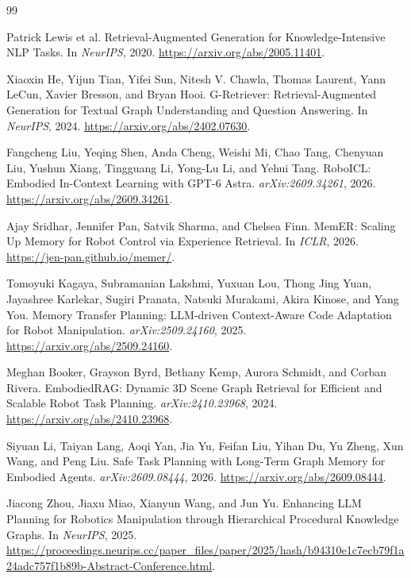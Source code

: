 \documentclass[10pt,twocolumn,letterpaper]{article}
\begin{document}

\begin{thebibliography}{99}

Patrick Lewis et al.
Retrieval-Augmented Generation for Knowledge-Intensive NLP Tasks.
In \emph{NeurIPS}, 2020.
\url{https://arxiv.org/abs/2005.11401}.

Xiaoxin He, Yijun Tian, Yifei Sun, Nitesh V. Chawla, Thomas Laurent, Yann LeCun, Xavier Bresson, and Bryan Hooi.
G-Retriever: Retrieval-Augmented Generation for Textual Graph Understanding and Question Answering.
In \emph{NeurIPS}, 2024.
\url{https://arxiv.org/abs/2402.07630}.

Fangcheng Liu, Yeqing Shen, Anda Cheng, Weishi Mi, Chao Tang, Chenyuan Liu, Yushun Xiang, Tingguang Li, Yong-Lu Li, and Yehui Tang.
RoboICL: Embodied In-Context Learning with GPT-6 Astra.
\emph{arXiv:2609.34261}, 2026.
\url{https://arxiv.org/abs/2609.34261}.

Ajay Sridhar, Jennifer Pan, Satvik Sharma, and Chelsea Finn.
MemER: Scaling Up Memory for Robot Control via Experience Retrieval.
In \emph{ICLR}, 2026.
\url{https://jen-pan.github.io/memer/}.

Tomoyuki Kagaya, Subramanian Lakshmi, Yuxuan Lou, Thong Jing Yuan, Jayashree Karlekar, Sugiri Pranata, Natsuki Murakami, Akira Kinose, and Yang You.
Memory Transfer Planning: LLM-driven Context-Aware Code Adaptation for Robot Manipulation.
\emph{arXiv:2509.24160}, 2025.
\url{https://arxiv.org/abs/2509.24160}.

Meghan Booker, Grayson Byrd, Bethany Kemp, Aurora Schmidt, and Corban Rivera.
EmbodiedRAG: Dynamic 3D Scene Graph Retrieval for Efficient and Scalable Robot Task Planning.
\emph{arXiv:2410.23968}, 2024.
\url{https://arxiv.org/abs/2410.23968}.

Siyuan Li, Taiyan Lang, Aoqi Yan, Jia Yu, Feifan Liu, Yihan Du, Yu Zheng, Xun Wang, and Peng Liu.
Safe Task Planning with Long-Term Graph Memory for Embodied Agents.
\emph{arXiv:2609.08444}, 2026.
\url{https://arxiv.org/abs/2609.08444}.

Jiacong Zhou, Jiaxu Miao, Xianyun Wang, and Jun Yu.
Enhancing LLM Planning for Robotics Manipulation through Hierarchical Procedural Knowledge Graphs.
In \emph{NeurIPS}, 2025.
\url{https://proceedings.neurips.cc/paper_files/paper/2025/hash/b94310e1c7ecb79f1a24adc757f1b89b-Abstract-Conference.html}.


\end{thebibliography}
\end{document}
